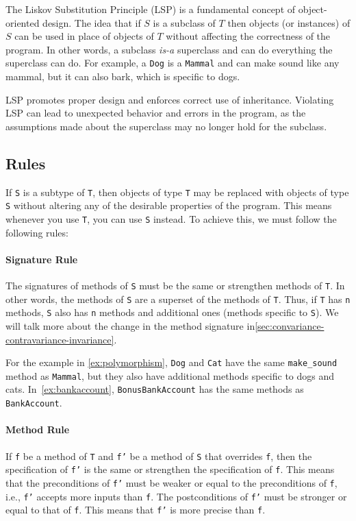 \documentclass[oneside,11pt,dvipsnames]{book}
\newcommand{\code}[1]{\texttt{#1}}
\begin{document}
The Liskov Substitution Principle (LSP) is a fundamental concept of object-oriented design.  
The idea that if $S$ is a subclass of $T$ then objects (or instances) of $S$ can be used in place of objects of $T$ without affecting the correctness of the program. In other words, a subclass \emph{is-a} superclass and can do everything the superclass can do.
For example, a \code{Dog} is a \code{Mammal} and can make sound like any mammal, but it can also bark, which is specific to dogs.

LSP promotes proper design and enforces correct use of inheritance.
Violating LSP can lead to unexpected behavior and errors in the program, as the assumptions made about the superclass may no longer hold for the subclass. 

\subsection{Rules} 
If \code{S} is a subtype of \code{T}, then objects of type \code{T} may be replaced with objects of type \code{S} without altering any of the desirable properties of the program. This means whenever you use \code{T}, you can use \code{S} instead. To achieve this, we must follow the following rules:

\paragraph{Signature Rule} The signatures of methods of \code{S} must be the same or strengthen methods of \code{T}. In other words, the methods of \code{S} are a superset of the methods of \code{T}. Thus, if \code{T} has \code{n} methods, \code{S} also has \code{n} methods and additional ones (methods specific to \code{S}). We will talk more about the change in the method signature in\autoref{sec:convariance-contravariance-invariance}.

For the example in \autoref{ex:polymorphism}, \code{Dog} and \code{Cat} have the same \code{make\_sound} method as \code{Mammal}, but they also have additional methods specific to dogs and cats.
In~\autoref{ex:bankaccount}, \code{BonusBankAccount} has the same methods as \code{BankAccount}.

\paragraph{Method Rule} 
If \code{f} be a method of \code{T} and \code{f'} be a method of \code{S} that overrides \code{f}, then 
the specification of \code{f'} is the same or strengthen the specification of \code{f}. This means that the preconditions of \code{f'} must be weaker or equal to the preconditions of \code{f}, i.e.,  \code{f'} accepts more inputs than \code{f}.  The postconditions of \code{f'} must be stronger or equal to that of \code{f}. This means that \code{f'} is more precise than \code{f}.
\end{document}
